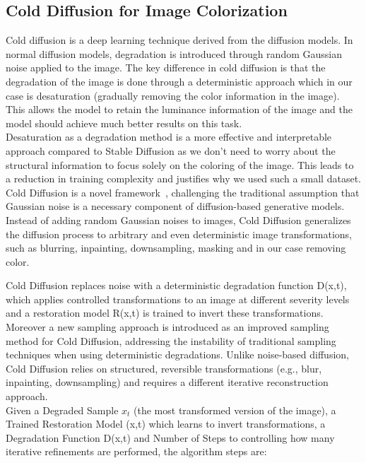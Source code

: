 \documentclass[10pt,twocolumn,letterpaper]{article}
\begin{document}
\subsection{Cold Diffusion for Image Colorization}
Cold diffusion is a deep learning technique derived from the diffusion models. In normal diffusion models, degradation is introduced through random Gaussian noise applied to the image. The key difference in cold diffusion is that the degradation of the image is done through a deterministic approach which in our case is desaturation (gradually removing the color information in the image). This allows the model to retain the luminance information of the image and the model should achieve much better results on this task.
\\
\indent
Desaturation as a degradation method is a more effective and interpretable approach compared to Stable Diffusion as we don’t need to worry about the structural information to focus solely on the coloring of the image. This leads to a reduction in training complexity and justifies why we used such a small dataset.
\\
\indent
Cold Diffusion is a novel framework~\cite{Cold}, challenging the traditional assumption that Gaussian noise is a necessary component of diffusion-based generative models. Instead of adding random Gaussian noises to images, Cold Diffusion generalizes the diffusion process to arbitrary and even deterministic image transformations, such as blurring, inpainting, downsampling, masking and in our case removing color.
\\
\indent

Cold Diffusion replaces noise with a deterministic degradation function D(x,t), which applies controlled transformations to an image at different severity levels and a restoration model R(x,t) is trained to invert these transformations. Moreover a new sampling approach is introduced as an improved sampling method for Cold Diffusion, addressing the instability of traditional sampling techniques when using deterministic degradations. Unlike noise-based diffusion, Cold Diffusion relies on structured, reversible transformations (e.g., blur, inpainting, downsampling) and requires a different iterative reconstruction approach. 
\\
\indent
Given a Degraded Sample $x_t $ (the most transformed version of the image), a Trained Restoration Model (x,t) which learns to invert transformations, a Degradation Function D(x,t) and Number of Steps to controlling how many iterative refinements are performed, the algorithm steps are:
\end{document}
